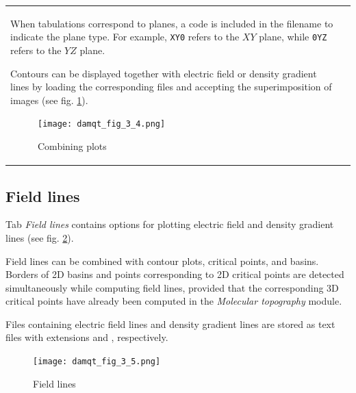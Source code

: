 \documentclass[10pt]{article}
\begin{document}
\begin{tabular}{lr}
\begin{minipage}{.5\linewidth}
When tabulations correspond to planes, a code is included in the filename to indicate the plane type.  
For example, \texttt{XY0} refers to the $XY$ plane, while \texttt{0YZ} refers to the $YZ$ plane.  

Contours can be displayed together with electric field or density gradient lines  
by loading the corresponding files and accepting the superimposition of images  
(see fig. \ref{fig:3_3b}).  



\vspace*{1mm}
\begin{figure}[H]
    \begin{center}
        \texttt{[image: damqt\_fig\_3\_4.png]}
    \end{center}
    \caption{Combining plots \label{fig:3_3b}}
\end{figure}

\end{minipage}
\end{tabular}

\subsection{Field lines \label{sec:3.2}}

\begin{minipage}{0.5\linewidth}
 
Tab {\it Field lines} contains options for plotting electric field and density gradient lines  
(see fig. \ref{fig:3_5}).  

Field lines can be combined with contour plots, critical points, and basins.  
Borders of 2D basins and points corresponding to 2D critical points  
are detected simultaneously while computing field lines,  
provided that the corresponding 3D critical points  
have already been computed in the {\it Molecular topography} module.  

Files containing electric field lines and density gradient lines  
are stored as text files with extensions \camdosD{} and \dengrdosD{}, respectively.  


\end{minipage}
\begin{minipage}{0.49\linewidth}
 \begin{figure}[H]
    \begin{center}
        \vspace*{1mm}
        \texttt{[image: damqt\_fig\_3\_5.png]}
    \end{center}
    \vspace*{1mm}
    \caption{Field lines \label{fig:3_5}}
\end{figure}
\end{minipage}
\end{document}
